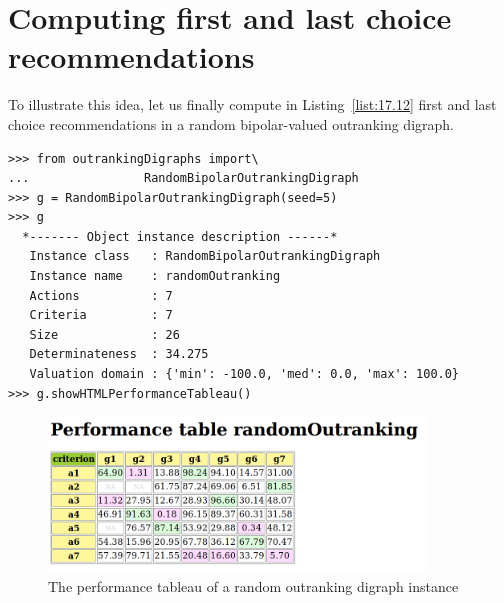 \section{Computing first and last choice recommendations}
\label{sec:17.4}

To illustrate this idea, let us finally compute in Listing~\vref{list:17.12} first and last choice recommendations in a random bipolar-valued outranking digraph.
\begin{lstlisting}[caption={Generating a random bipolar-valued outranking digraph},label=list:17.12]
>>> from outrankingDigraphs import\
...                RandomBipolarOutrankingDigraph
>>> g = RandomBipolarOutrankingDigraph(seed=5)
>>> g
  *------- Object instance description ------*
   Instance class   : RandomBipolarOutrankingDigraph
   Instance name    : randomOutranking
   Actions          : 7
   Criteria         : 7
   Size             : 26
   Determinateness  : 34.275
   Valuation domain : {'min': -100.0, 'med': 0.0, 'max': 100.0}
>>> g.showHTMLPerformanceTableau()
\end{lstlisting}
\begin{figure}[ht]
\includegraphics[width=10cm]{Figures/17-6-randomOutranking.png}
\caption{The performance tableau of a random outranking digraph instance}
\label{fig:17.6}       %
\end{figure}

